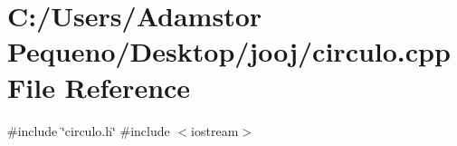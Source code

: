 \section{C\+:/\+Users/\+Adamstor Pequeno/\+Desktop/jooj/circulo.cpp File Reference}
\label{circulo_8cpp}
{\ttfamily \#include \char`\"{}circulo.\+h\char`\"{}}\newline
{\ttfamily \#include $<$iostream$>$}\newline
